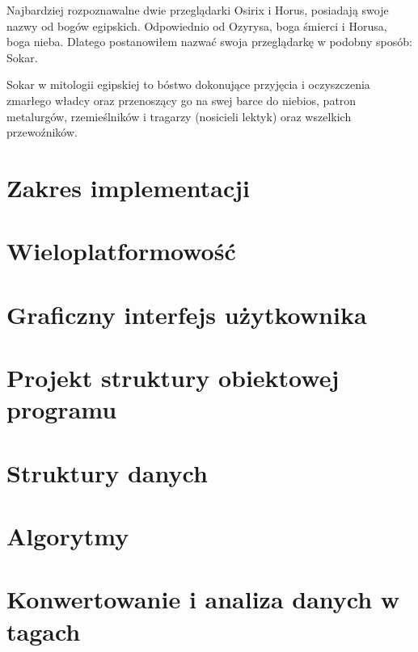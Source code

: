 
\par
Najbardziej rozpoznawalne dwie przeglądarki Osirix i Horus, posiadają swoje nazwy od bogów egipskich.
Odpowiednio od Ozyrysa, boga śmierci i Horusa, boga nieba.
Dlatego postanowiłem nazwać swoja przeglądarkę w podobny sposób: Sokar.
\par
Sokar w mitologii egipskiej to bóstwo dokonujące przyjęcia i oczyszczenia zmarłego władcy oraz przenoszący go na swej barce do niebios, patron metalurgów, rzemieślników i tragarzy (nosicieli lektyk) oraz wszelkich przewoźników.

\section{Zakres implementacji}


\section{Wieloplatformowość}


\section{Graficzny interfejs użytkownika}


\section{Projekt struktury obiektowej programu}
\sokarclassExplanations


\section{Struktury danych}


\section{Algorytmy}


\section{Konwertowanie i analiza danych w tagach}


\section{}


